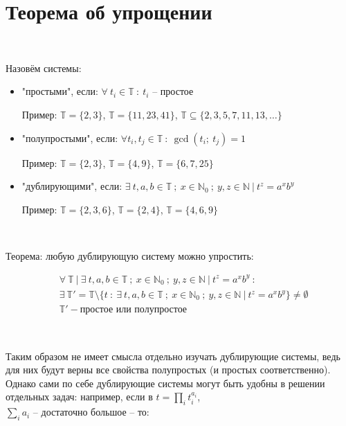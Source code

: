 \vspace{0.5in}

\section{Теорема об упрощении}

\

\noindent Назовём системы:

\begin{itemize}
	\item "простыми", если: $\forall \ t_i \in \mathbb{T} \ : \ t_i$ -- простое
		
		Пример: $\mathbb{T} = \{2, 3\}$, $\mathbb{T} = \{11, 23, 41\}$, $\mathbb{T} \subseteq \{2, 3, 5, 7, 11, 13, \ldots\}$
	
	\item "полупростыми", если: $\forall t_i, t_j \in \mathbb{T} \ : \ \gcd(t_i; \ t_j) = 1$
	
		Пример: $\mathbb{T} = \{2, 3\}$, $\mathbb{T} = \{4, 9\}$, $\mathbb{T} = \{6, 7, 25\}$
	
	\item "дублирующими", если: $\exists \ t, a, b \in \mathbb{T} \ ; \ x \in \mathbb{N}_0 \ ; \ y, z \in \mathbb{N} \ | \ t^z = a^x b^y$
	
		Пример: $\mathbb{T} = \{2, 3, 6\}$, $\mathbb{T} = \{2, 4\}$, $\mathbb{T} = \{4, 6, 9\}$
\end{itemize}

\

Теорема: любую дублирующую систему можно упростить:

\begin{align*}
	&\forall \ \mathbb{T} \ | \ \exists \ t, a, b \in \mathbb{T} \ ; \ x \in \mathbb{N}_0 \ ; \ y, z \in \mathbb{N} \ | \ t^z = a^x b^y \ : \\
	&\exists \ \mathbb{T}' = \mathbb{T} \setminus \{t \ : \ \exists \ t, a, b \in \mathbb{T} \ ; \ x \in \mathbb{N}_0 \ ; \ y, z \in \mathbb{N} \ | \ t^z = a^x b^y \} \ne \emptyset \\
	&\mathbb{T}' - \text{простое или полупростое}
\end{align*}

\

Таким образом не имеет смысла отдельно изучать дублирующие системы, ведь для них будут верны все свойства полупростых (и простых соответственно). Однако сами по себе дублирующие системы могут быть удобны в решении отдельных задач: например, если в $t = \prod_i t_i^{a_i}$, \\ $\sum_i a_i$ -- достаточно большое -- то:

